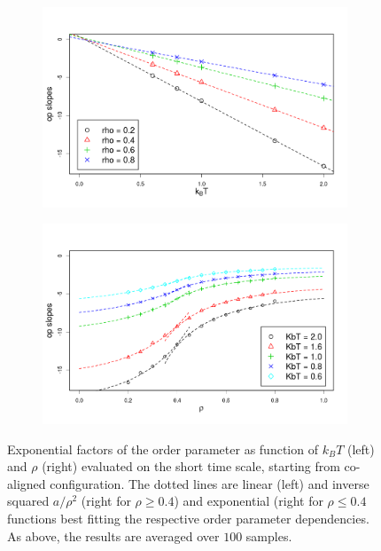 \begin{figure}[h]
\begin{subfigure}[t]{0.5\textwidth}
	\centering
	\includegraphics[width=\textwidth]{Images/op_slopes_short_vs_kbt.png}
	\captionsetup{justification=centering, width=0.9\columnwidth}
	\caption{}
	\label{fig:exponential_factors:kbt}
\end{subfigure}
\begin{subfigure}[t]{0.5\textwidth}
	\centering
	\includegraphics[width=\textwidth]{Images/op_slopes_short_vs_rho.png}
	\captionsetup{justification=centering, width=0.9\columnwidth}
	\caption{}
	\label{fig:exponential_factors:rho}
\end{subfigure}
\captionsetup{justification=centering, width=0.9\columnwidth}
\caption{Exponential factors of the order parameter as function of $k_BT$ (left) and $\rho$ (right) evaluated on the short time scale, starting from co-aligned configuration. The dotted lines are linear (left) and inverse squared $a/\rho^2$ (right for $\rho \geq 0.4$) and exponential (right for $\rho \leq 0.4$ functions best fitting the respective order parameter dependencies. As above, the results are averaged over $100$ samples.}
\label{fig:exponential_factors}
\end{figure}
